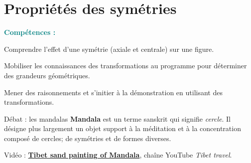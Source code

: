 \graphicspath{{../../S28_Proprietes_des_symetries/Images/}}

\themeM
\chapter{Propriétés des symétries}
\label{S28}

\textcolor{teal}{\bf Compétences :}
   \begin{competences}
      \item Comprendre l’effet d’une symétrie (axiale et centrale) sur une figure.
      \item Mobiliser les connaissances des transformations au programme pour déterminer des grandeurs géométriques.
      \item Mener des raisonnements et s’initier à la démonstration en utilisant des transformations.
   \end{competences}

\vfill

\begin{debat}{Débat : les mandalas}
   {\bf Mandala} est un terme sanskrit qui signifie {\it cercle}. Il désigne plus largement un objet support à la méditation et à la concentration composé de cercles; de symétries et de formes diverses.
   \tcblower
\end{debat}

\hfill {\gray Vidéo : \href{https://www.youtube.com/watch?time_continue=262&v=bgoHUH-_yWo&feature=emb_logo}{\bf Tibet sand painting of Mandala}, chaîne YouTube {\it Tibet travel}.}


